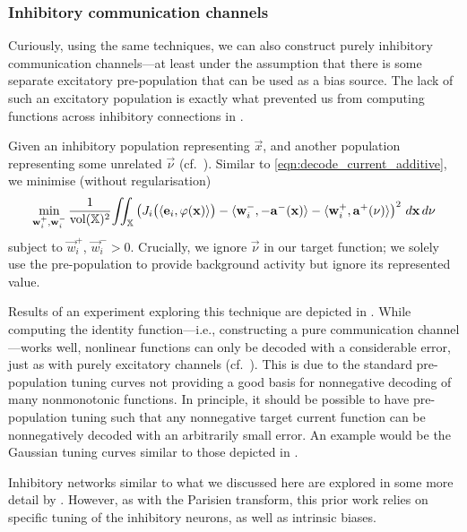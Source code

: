 \subsubsection{Inhibitory communication channels}
Curiously, using the same techniques, we can also construct purely inhibitory communication channels---at least under the assumption that there is some separate excitatory pre-population that can be used as a bias source.
The lack of such an excitatory population is exactly what prevented us from computing functions across inhibitory connections in .

Given an inhibitory population representing $\vec x$, and another population representing some unrelated $\vec \nu$ (cf.~).
Similar to \cref{eqn:decode_current_additive}, we minimise (without regularisation)
\begin{align}
	\min_{\vec w_i^+, \vec w_i^-}
	\frac{1}{\vol(\Xrepr)^2} \! \iint_{\Xrepr}
	\left(
		J_i\bigl(\langle \vec e_i, \phi(\vec x) \rangle\bigr)
		- \langle \vec w^-_i, -\vec a^-(\vec x) \rangle
		- \langle \vec w^+_i, \vec a^+(\vec \nu) \rangle
	\right)^2 \, d\vec x \, d\vec \nu %
	\label{eqn:inhibitory_communication_channel}
\end{align}
subject to $\vec w_{i}^+$, $\vec w_{i}^- > 0$.
Crucially, we ignore $\vec \nu$ in our target function; we solely use the pre-population to provide background activity but ignore its represented value.

Results of an experiment exploring this technique are depicted in .
While computing the identity function---i.e., constructing a pure communication channel---works well, nonlinear functions can only be decoded with a considerable error, just as with purely excitatory channels (cf.~).
This is due to the standard \NEF pre-population tuning curves not providing a good basis for nonnegative decoding of many nonmonotonic functions.
In principle, it should be possible to have pre-population tuning such that any nonnegative target current function can be nonnegatively decoded with an arbitrarily small error.
An example would be the Gaussian tuning curves similar to those depicted in .

Inhibitory networks similar to what we discussed here are explored in some more detail by \citet{tripp2016function}.
However, as with the Parisien transform, this prior work relies on specific tuning of the inhibitory neurons, as well as intrinsic biases.

